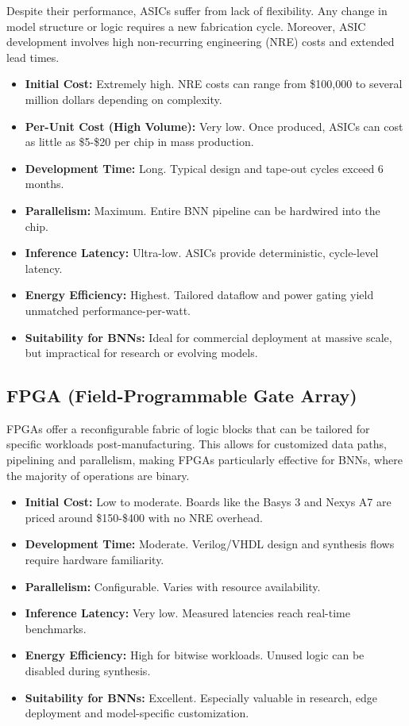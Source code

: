 \documentclass[a4paper,12pt]{report}
\begin{document}
Despite their performance, ASICs suffer from lack of flexibility. Any change in model structure or logic requires a new fabrication cycle. Moreover, ASIC development involves high non-recurring engineering (NRE) costs and extended lead times.
\begin{itemize}
    \item \textbf{Initial Cost:} Extremely high. NRE costs can range from \$100,000 to several million dollars depending on complexity.
    \item \textbf{Per-Unit Cost (High Volume):} Very low. Once produced, ASICs can cost as little as \$5-\$20 per chip in mass production.
    \item \textbf{Development Time:} Long. Typical design and tape-out cycles exceed 6 months.
    \item \textbf{Parallelism:} Maximum. Entire BNN pipeline can be hardwired into the chip.
    \item \textbf{Inference Latency:} Ultra-low. ASICs provide deterministic, cycle-level latency.
    \item \textbf{Energy Efficiency:} Highest. Tailored dataflow and power gating yield unmatched performance-per-watt.
    \item \textbf{Suitability for BNNs:} Ideal for commercial deployment at massive scale, but impractical for research or evolving models.
\end{itemize}

\subsection{FPGA (Field-Programmable Gate Array)}
FPGAs offer a reconfigurable fabric of logic blocks that can be tailored for specific workloads post-manufacturing. This allows for customized data paths, pipelining and parallelism, making FPGAs particularly effective for BNNs, where the majority of operations are binary.
\begin{itemize}
    \item \textbf{Initial Cost:} Low to moderate. Boards like the Basys 3 and Nexys A7 are priced around \$150-\$400 with no NRE overhead.
    \item \textbf{Development Time:} Moderate. Verilog/VHDL design and synthesis flows require hardware familiarity.
    \item \textbf{Parallelism:} Configurable. Varies with resource availability.
    \item \textbf{Inference Latency:} Very low. Measured latencies reach real-time benchmarks.
    \item \textbf{Energy Efficiency:} High for bitwise workloads. Unused logic can be disabled during synthesis.
    \item \textbf{Suitability for BNNs:} Excellent. Especially valuable in research, edge deployment and model-specific customization.
\end{itemize}
\end{document}
